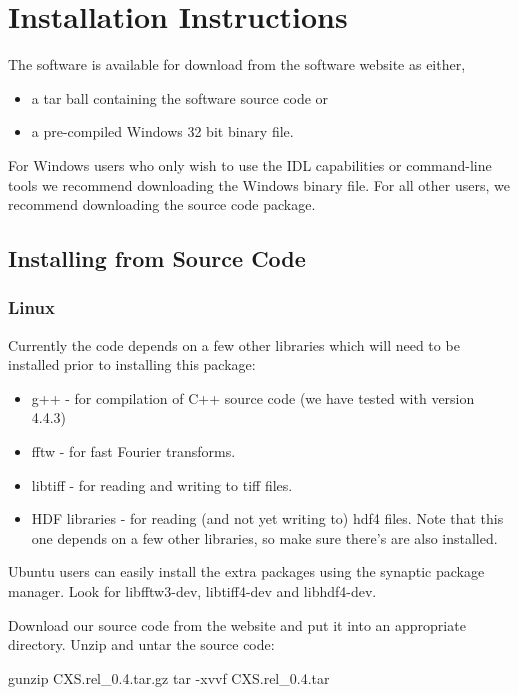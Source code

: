 \documentclass[]{cxs-software}
\begin{document}

\newpage
\section{Installation Instructions}
\label{installation}

The software is available for download from the software website as either,
\begin{itemize}
\item a tar ball containing the software source code or
\item a pre-compiled Windows 32 bit binary file.
\end{itemize}

For Windows users who only wish to use the IDL capabilities or
command-line tools we recommend downloading the Windows binary file. For
all other users, we recommend downloading the source code package.

\subsection{Installing from Source Code}

\subsubsection{Linux}

Currently the code depends on a few other libraries which will need to
be installed prior to installing this package:
\begin{itemize}
\item g++\cite{} - for compilation of C++ source code (we have tested with version 4.4.3)
\item fftw\cite{} - for fast Fourier transforms.
\item libtiff\cite{} - for reading and writing to tiff files.
\item HDF libraries\cite{} - for reading (and not yet writing to) hdf4
  files. Note that this one depends on a few other libraries, so make
  sure there's are also installed.
\end{itemize}

Ubuntu users can easily install the extra packages using the synaptic
package manager. Look for libfftw3-dev, libtiff4-dev and libhdf4-dev.

Download our source code from the website and put
it into an appropriate directory. Unzip and untar the source code: 
\begin{myverbatim}
  gunzip CXS.rel_0.4.tar.gz 
  tar -xvvf CXS.rel_0.4.tar
\end{myverbatim}
\end{document}
